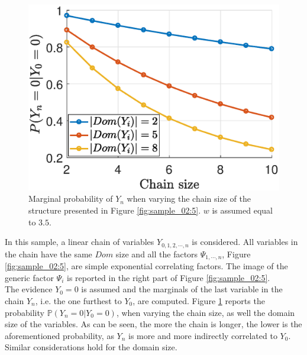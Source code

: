 \begin{figure}
	\centering
\includegraphics[width=0.48 \columnwidth]{../Chapter_additional/03_Samples/image_02/Chain_marginals.eps}
\caption{Marginal probability of $Y_n$ when varying the chain size of the structure presented in Figure \ref{fig:sample_02:5}. $w$ is assumed equal to $3.5$.}
\label{fig:sample_02:6}
\end{figure} 


In this sample, a linear chain of variables $Y_{0,1,2,\cdots,n}$ is considered. All variables in the chain have the same $Dom$ size and all the factors $\Psi_{1,\cdots,n}$, Figure \ref{fig:sample_02:5}, are simple exponential correlating factors. The image of the generic factor $\Psi_i$ is reported in the right part of Figure \ref{fig:sample_02:5}.
\\
The evidence $Y_0=0$ is assumed and the marginals of the last variable in the chain $Y_n$, i.e. the one furthest to $Y_0$, are computed. Figure \ref{fig:sample_02:6} reports the probability $\mathbb{P}(Y_n = 0 | Y_0 = 0)$, when varying the chain size, as well the domain size of the variables. As can be seen, the more the chain is longer, the lower is the aforementioned probability, as $Y_n$ is more and more indirectly correlated to $Y_0$. Similar considerations hold for the domain size.



